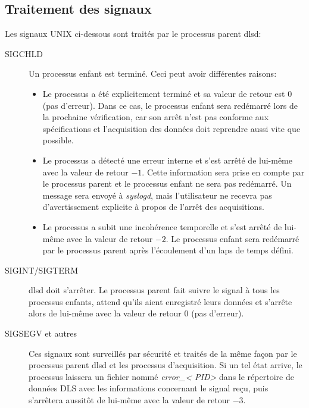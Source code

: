 \documentclass[a4paper,12pt,BCOR6mm,bibtotoc,idxtotoc]{scrbook}
\begin{document}
\subsection{Traitement des signaux}
\label{sec:dlsd_mother_signals}

Les signaux UNIX ci-dessous sont trait\'es par le processus parent dlsd:

\begin{description}
\item[SIGCHLD] Un processus enfant est termin\'e. Ceci peut avoir
  diff\'erentes raisons:
  \begin{itemize}

  \item Le processus a \'et\'e explicitement termin\'e et sa valeur de
    retour est 0 (pas d'erreur).  Dans ce cas, le processus enfant
    sera red\'emarr\'e lors de la prochaine v\'erification, car son
    arr\^et n'est pas conforme aux sp\'ecifications et l'acquisition
    des donn\'ees doit reprendre aussi vite que possible.

  \item Le processus a d\'etect\'e une erreur interne et s'est
    arr\^et\'e de lui-m\^eme avec la valeur de retour $-1$.  Cette
    information sera prise en compte par le processus parent et le
    processus enfant ne sera pas red\'emarr\'e. Un message sera
    envoy\'e \`a \textit{syslogd}, mais l'utilisateur
    ne recevra pas d'avertissement explicite \`a propos de l'arr\^et des
    acquisitions.

  \item Le processus a subit une incoh\'erence temporelle et s'est
    arr\^et\'e de lui-m\^eme avec la valeur de retour $-2$.  Le
    processus enfant sera red\'emarr\'e par le processus parent
    apr\`es l'\'ecoulement d'un laps de temps d\'efini.

  \end{itemize}

\item[SIGINT/SIGTERM] dlsd doit s'arr\^eter. Le processus parent fait
  suivre le signal \`a tous les processus enfants, attend qu'ils aient
  enregistr\'e leurs donn\'ees et s'arr\^ete alors de lui-m\^eme avec la
  valeur de retour 0 (pas d'erreur).

\item[SIGSEGV et autres] Ces signaux sont surveill\'es par
  s\'ecurit\'e et trait\'es de la m\^eme fa\c con par le processus
  parent dlsd et les processus d'acquisition. Si un tel \'etat arrive,
  le processus laissera un fichier nomm\'e \textit{error\_\textless
    PID\textgreater} dans le r\'epertoire de donn\'ees DLS avec les
  informations concernant le signal re\c cu, puis s'arr\^etera
  aussit\^ot de lui-m\^eme avec la valeur de retour $-3$.

\end{description}
\end{document}
